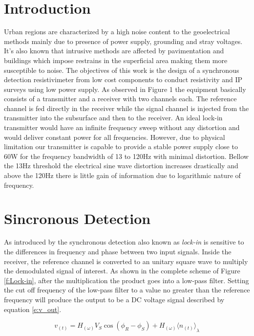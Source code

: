 \documentclass{vie16}
\begin{document}
\section{Introduction}
Urban regions are characterized by a high noise content to the
geoelectrical methods mainly due to presence of power supply,
grounding and stray voltages. It's also known that intrusive methods
are affected by pavimentation and buildings which impose restrains in
the superficial area making them more susceptible to noise. The
objectives of this work is the design of a synchronous detection
resistivimeter from low cost components to conduct resistivity and IP
surveys using low power supply.  As observed in Figure 1 the equipment
basically consists of a transmitter and a receiver with two channels
each. The reference channel is fed directly in the receiver while the
signal channel is injected from the transmitter into the subsurface
and then to the receiver. An ideal lock-in transmitter would have an
infinite frequency sweep without any distortion and would deliver
constant power for all frequencies. However, due to physical
limitation our transmitter is capable to provide a stable power supply
close to 60W for the frequency bandwidth of 13 to 120Hz with minimal
distortion.  Bellow the 13Hz threshold the electrical sine wave
distortion increases drastically and above the 120Hz there is little
gain of information due to logarithmic nature of frequency.

\section{Sincronous Detection}
As introduced by \citet{meade13} the synchronous detection also known
as \textit{lock-in} is sensitive to the differences in frequency and
phase between two input signals.  Inside the receiver, the reference
channel is converted to an unitary square wave to multiply the
demodulated signal of interest. As shown in the complete scheme of
Figure \ref{f:Lock-in}, after the multiplication the product goes
into a low-pass filter. Setting the cut off frequency of the low-pass
filter to a value no greater than the reference frequency will produce
the output to be a DC voltage signal described by equation \ref{e:v_out}.

\begin{equation}
	v_{(t)} = H_{(\omega)} V_{S} 
									\cos \left(
												\phi_{R} - \phi_{S}
										 \right)
						+
				H_{(\omega)} {\langle n_{(t)} \rangle}_{\lambda}
	\label{e:v_out}
\end{equation}
\end{document}
